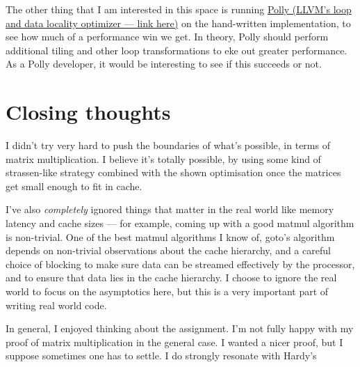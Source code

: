 \documentclass[11pt]{article}
\begin{document}
The other thing that I am interested in this space is running 
\href{https://polly.llvm.org/}{Polly (LLVM's loop and data locality optimizer --- link here)} on the hand-written 
implementation, to see how much of a performance win we get. In
theory, Polly should perform additional tiling and other loop transformations
to eke out greater performance. As a Polly developer, it would be interesting
to see if this succeeds or not.



\section{Closing thoughts}
I didn't try very hard to push the boundaries of what's possible, in terms 
of matrix multiplication. I believe it's totally possible, by using some kind
of strassen-like strategy combined with the shown optimisation once the
matrices get small enough to fit in cache.

I've also \textit{completely} ignored things that matter in the real world
like memory latency and cache sizes --- for example, coming up with a good
matmul algorithm is non-trivial. One of the best matmul algorithms I know of,
goto's algorithm depends on non-trivial observations about the cache hierarchy,
and a careful choice of blocking to make sure data can be streamed effectively
by the processor, and to ensure that data lies in the cache hierarchy. I
choose to ignore the real world to focus on the asymptotics here, but this
is a very important part of writing real world code.

In general, I enjoyed thinking about the assignment. I'm not fully happy with
my proof of matrix multiplication in the general case. I wanted a nicer proof,
but I suppose sometimes one has to settle. I do strongly resonate with Hardy's
\end{document}
